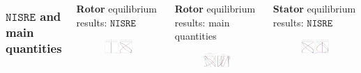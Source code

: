 \begin{columns}
	\subsubsection{$\mathtt{NISRE}$ and main quantities}
	\begin{frame}{\textbf{Rotor} equilibrium results: $\mathtt{NISRE}$}
		\begin{figure}
			\centering
			\includegraphics[width=1\textwidth]{figures/rotorVelocity.png}
		\end{figure}
	\end{frame}
	\begin{frame}{\textbf{Rotor} equilibrium results: main quantities}
		\begin{figure}
			\centering
			\includegraphics[width=1\textwidth]{figures/rotorThermo.png}
		\end{figure}
	\end{frame}
	\begin{frame}{\textbf{Stator} equilibrium results: $\mathtt{NISRE}$}
		\begin{figure}
			\centering
			\includegraphics[width=1\textwidth]{figures/statorVelocity.png}

\end{figure}
\end{frame}
\end{columns}

